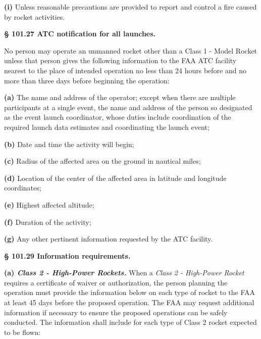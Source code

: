 \textbf{(i)} Unless reasonable precautions are provided to report and control a fire caused by rocket activities.\par

\textbf{§ 101.27 ATC notification for all launches.}\par

No person may operate an unmanned rocket other than a Class 1 - Model Rocket unless that person gives the following information to the FAA ATC facility nearest to the place of intended operation no less than 24 hours before and no more than three days before beginning the operation:\par

\textbf{(a)} The name and address of the operator; except when there are multiple participants at a single event, the name and address of the person so designated as the event launch coordinator, whose duties include coordination of the required launch data estimates and coordinating the launch event;\par

\textbf{(b)} Date and time the activity will begin;\par

\textbf{(c)} Radius of the affected area on the ground in nautical miles;\par

\textbf{(d)} Location of the center of the affected area in latitude and longitude coordinates;\par

\textbf{(e)} Highest affected altitude;\par

\textbf{(f)} Duration of the activity;\par

\textbf{(g)} Any other pertinent information requested by the ATC facility.\par

\textbf{§ 101.29 Information requirements.}\par

\textbf{(a)\textit{ Class 2 - High-Power Rockets.}} When a \textit{Class 2 - High-Power Rocket} requires a certificate of waiver or authorization, the person planning the operation must provide the information below on each type of rocket to the FAA at least 45 days before the proposed operation. The FAA may request additional information if necessary to ensure the proposed operations can be safely conducted. The information shall include for each type of Class 2 rocket expected to be flown:\par

